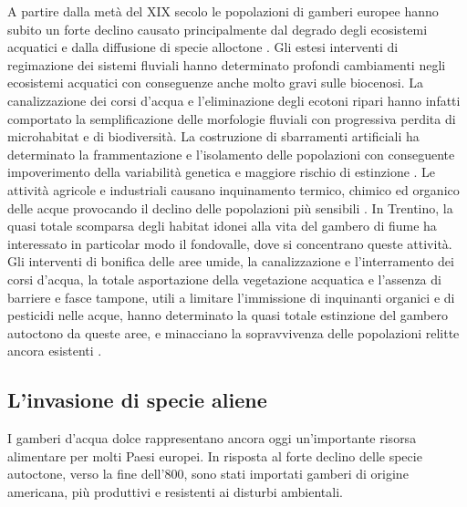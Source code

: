 \documentclass[10pt,twoside,openany,x11names,svgnames,italian,a5paper,dvipsnames,table]{memoir}
\begin{document}
A partire dalla metà del XIX secolo le popolazioni di gamberi europee hanno subito un forte declino causato principalmente dal degrado degli ecosistemi acquatici e dalla diffusione di specie alloctone \cite{Souty}. 
Gli estesi interventi di regimazione dei sistemi fluviali hanno determinato profondi cambiamenti negli ecosistemi acquatici con conseguenze anche molto gravi sulle biocenosi. La canalizzazione dei corsi d’acqua e l’eliminazione degli \gls{ecotoni} ripari hanno infatti comportato la semplificazione delle morfologie fluviali con progressiva perdita di microhabitat e di biodiversità. La costruzione di sbarramenti artificiali ha determinato la frammentazione e l’isolamento delle popolazioni con conseguente impoverimento della variabilità genetica e maggiore rischio di estinzione \cite{Lortscher}. Le attività agricole e industriali causano inquinamento termico, chimico ed organico delle acque provocando il declino delle popolazioni più sensibili \cite{Matthews}. In Trentino, la quasi totale scomparsa degli habitat idonei alla vita del gambero di fiume ha interessato in particolar modo il fondovalle, dove si concentrano queste attività. Gli interventi di bonifica delle aree umide, la canalizzazione e l’interramento dei corsi d’acqua, la totale asportazione della vegetazione acquatica e l’assenza di barriere e fasce tampone, utili a limitare l’immissione di inquinanti organici e di pesticidi nelle acque, hanno determinato la quasi totale estinzione del gambero autoctono da queste aree, e minacciano la sopravvivenza delle popolazioni relitte ancora esistenti \cite{Endrizzi13a}.

\subsection{L'invasione di specie aliene}

I gamberi d’acqua dolce rappresentano ancora oggi un’importante risorsa alimentare per molti Paesi europei. In risposta al forte declino delle specie autoctone, verso la fine dell’800, sono stati importati gamberi di origine americana, più produttivi e resistenti ai disturbi ambientali. 
\end{document}
